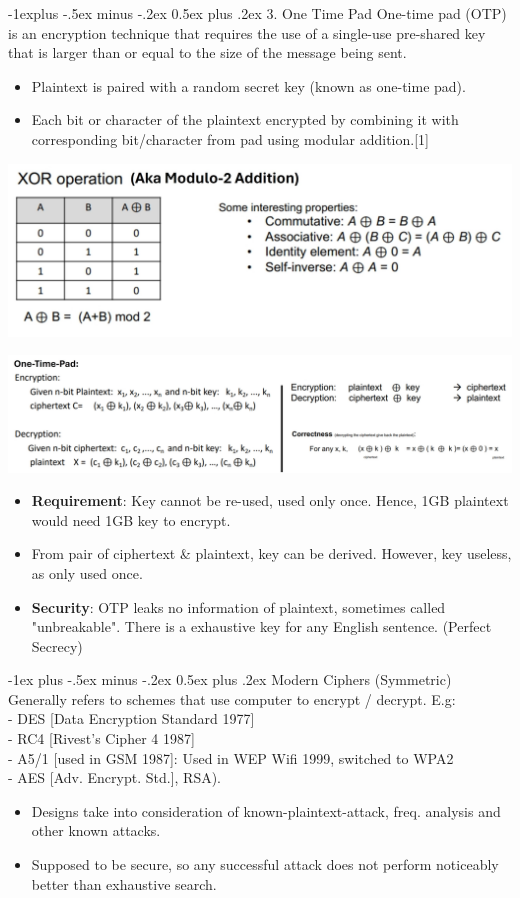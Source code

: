 \documentclass[10pt, landscape]{article}
\makeatletter
\renewcommand{\section}{\@startsection{section}{1}{0mm}%
                                {-1ex plus -.5ex minus -.2ex}%
                                {0.5ex plus .2ex}%
                                {\normalfont\large\bfseries}}
\renewcommand{\subsection}{\@startsection{subsection}{2}{0mm}%
                                {-1explus -.5ex minus -.2ex}%
                                {0.5ex plus .2ex}%
                                {\normalfont\normalsize\bfseries}}
\makeatother
\begin{document}
\begin{multicols*}{3}
\columnbreak

\subsection{3. One Time Pad}
One-time pad (OTP) is an encryption technique that requires the use of a single-use pre-shared key that is larger than or equal to the size of the message being sent. 
\begin{itemize}
\item Plaintext is paired with a random secret key (known as one-time pad). 
\item Each bit or character of the plaintext encrypted by combining it with corresponding bit/character from pad using modular addition.[1]
\end{itemize}
\centerline{\includegraphics[width=0.4\linewidth]{XOR}}
\centerline{\includegraphics[width=1\linewidth]{OTP}}
\begin{itemize}
\item \textbf{Requirement}: Key cannot be re-used, used only once. Hence, 1GB plaintext would need 1GB key to encrypt.
\item From pair of ciphertext \& plaintext, key can be derived. However, key useless, as only used once.
\item \textbf{Security}: OTP leaks no information of plaintext, sometimes called "unbreakable". There is a exhaustive key for any English sentence. (Perfect Secrecy)
\end{itemize}

\section{Modern Ciphers (Symmetric)}
Generally refers to schemes that use computer to encrypt / decrypt. E.g:
\\ - DES [Data Encryption Standard 1977] 
\\ - RC4 [Rivest's Cipher 4 1987]
\\ - A5/1 [used in GSM 1987]: Used in WEP Wifi 1999, switched to WPA2
\\ - AES [Adv. Encrypt. Std.], RSA).
\begin{itemize}
\item Designs take into consideration of known-plaintext-attack, freq. analysis and other known attacks.
\item Supposed to be secure, so any successful attack does not perform noticeably better than exhaustive search.
\end{itemize}


\end{multicols*}
\end{document}
